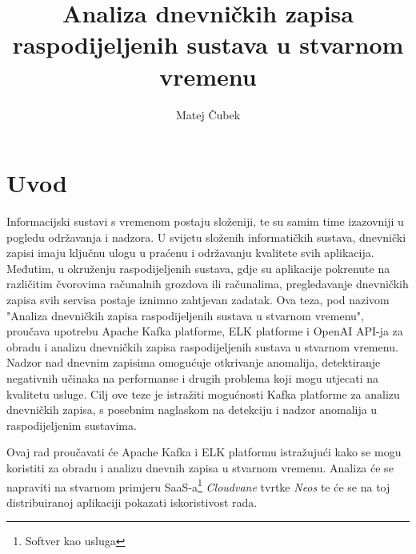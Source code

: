 \documentclass[times, utf8, diplomski]{fer}
\begin{document}

\title{Analiza dnevničkih zapisa raspodijeljenih sustava u stvarnom vremenu}

\author{Matej Čubek}

\maketitle

\zahvala{}

\renewcommand{\lstlistingname}{Isječak koda}%
\renewcommand{\lstlistlistingname}{Indeks isječka kodova}%


\tableofcontents


\begingroup
\renewcommand*\listfigurename{Indeks slika}
\renewcommand*\listtablename{Indeks tablica}

\listoffigures

\listoftables

\endgroup

\chapter{Uvod}

Informacijski sustavi s vremenom postaju složeniji, te su samim time izazovniji u pogledu održavanja i nadzora. U svijetu složenih informatičkih sustava, dnevnički zapisi imaju ključnu ulogu u praćenu i održavanju kvalitete svih aplikacija. Međutim, u okruženju raspodijeljenih sustava, gdje su aplikacije pokrenute na različitim čvorovima računalnih grozdova ili računalima, pregledavanje dnevničkih zapisa svih servisa postaje iznimno zahtjevan zadatak. Ova teza, pod nazivom "Analiza dnevničkih zapisa raspodijeljenih sustava u stvarnom vremenu", proučava upotrebu Apache Kafka platforme, ELK platforme i OpenAI API-ja za obradu i analizu dnevničkih zapisa raspodijeljenih sustava u stvarnom vremenu.\\

Nadzor nad dnevnim zapisima omogućuje otkrivanje anomalija, detektiranje negativnih učinaka na performanse i drugih problema koji mogu utjecati na kvalitetu usluge. Cilj ove teze je istražiti mogućnosti Kafka platforme za analizu dnevničkih zapisa, s posebnim naglaskom na detekciju i nadzor anomalija u raspodijeljenim sustavima.

Ovaj rad proučavati će Apache Kafka  i ELK platformu istražujući kako se mogu koristiti za obradu i analizu dnevnih zapisa u stvarnom vremenu. Analiza će se napraviti na stvarnom primjeru SaaS-a\footnote{Softver kao usluga } \emph{Cloudvane} tvrtke \emph{Neos} te će se na toj distribuiranoj aplikaciji pokazati iskoristivost rada.
\end{document}
